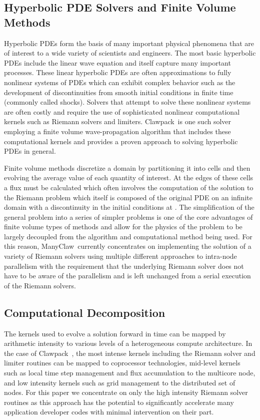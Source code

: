 \documentclass{article}
\def\clawpack{Clawpack~}
\def\manyclaw{ManyClaw~}
\begin{document}
\subsection{Hyperbolic PDE Solvers and Finite Volume Methods}

Hyperbolic PDEs form the basis of many important physical phenomena that are of
interest to a wide variety of scientists and engineers. The most basic
hyperbolic PDEs include the linear wave equation and itself capture many
important processes. These linear hyperbolic PDEs are often approximations to
fully nonlinear systems of PDEs which can exhibit complex behavior such as the
development of discontinuities from smooth initial conditions in finite time
(commonly called shocks). Solvers that attempt to solve these nonlinear systems
are often costly and require the use of sophisticated nonlinear computational
kernels such as Riemann solvers and limiters. \clawpack is one such solver
employing a finite volume wave-propagation algorithm that includes these
computational kernels and provides a proven approach to solving hyperbolic PDEs
in general.

Finite volume methods discretize a domain by partitioning it into cells and
then evolving the average value of each quantity of interest. At the edges of
these cells a flux must be calculated which often involves the computation of
the solution to the Riemann problem which itself is composed of the original
PDE on an infinite domain with a discontinuity in the initial conditions at
. The simplification of the general problem into a series of simpler
problems is one of the core advantages of finite volume types of methods and
allow for the physics of the problem to be largely decoupled from the algorithm
and computational method being used. For this reason, \manyclaw currently
concentrates on implementing the solution of a variety of Riemann solvers using
multiple different approaches to intra-node parallelism with the requirement
that the underlying Riemann solver does not have to be aware of the parallelism
and is left unchanged from a serial execution of the Riemann solvers.

\subsection{Computational Decomposition}

The kernels used to evolve a solution forward in time can be mapped by
arithmetic intensity to various levels of a heterogeneous compute architecture.
In the case of \clawpack, the most intense kernels including the Riemann solver
and limiter routines can be mapped to coprocessor technologies, mid-level
kernels such as local time step management and flux accumulation to the
multicore node, and low intensity kernels such as grid management to the
distributed set of nodes. For this paper we concentrate on only the high
intensity Riemann solver routines as this approach has the potential to
significantly accelerate many application developer codes with minimal
intervention on their part.
\end{document}
